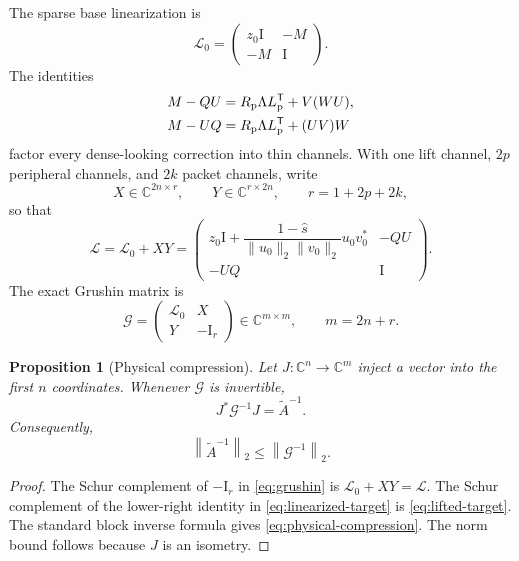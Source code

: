\documentclass[11pt]{article}
\newtheorem{proposition}[theorem]{Proposition}
\theoremstyle{definition}
\theoremstyle{remark}
\newcommand{\C}{\mathbb C}
\newcommand{\Id}{\mathrm I}
\newcommand{\norm}[1]{\left\lVert#1\right\rVert}
\newcommand{\Atilde}{\widetilde A}
\newcommand{\Gmat}{\mathcal G}
\begin{document}
The sparse base linearization is
\begin{equation}
 \mathcal L_0=
 \begin{pmatrix}
  z_0\Id&-M\\
  -M&\Id
 \end{pmatrix}.
 \label{eq:sparse-base}
\end{equation}
The identities
\begin{align}
 M-QU&=R_{\rm p}\Lambda L_{\rm p}^{\mathsf T}+V(WU),
 \label{eq:top-correction}\\
 M-UQ&=R_{\rm p}\Lambda L_{\rm p}^{\mathsf T}+(UV)W
 \label{eq:bottom-correction}
\end{align}
factor every dense-looking correction into thin channels.  With one lift
channel, $2p$ peripheral channels, and $2k$ packet channels, write
\begin{equation}
 X\in\C^{2n\times r},\qquad
 Y\in\C^{r\times2n},\qquad
 r=1+2p+2k,
 \label{eq:channel-shapes}
\end{equation}
so that
\begin{equation}
 \mathcal L=\mathcal L_0+XY
 =
 \begin{pmatrix}
 z_0\Id+\dfrac{1-\widehat s}{\|u_0\|_2\|v_0\|_2}u_0v_0^*
 &-QU\\
 -UQ&\Id
 \end{pmatrix}.
 \label{eq:linearized-target}
\end{equation}
The exact Grushin matrix is
\begin{equation}
 \Gmat=
 \begin{pmatrix}
  \mathcal L_0&X\\
  Y&-\Id_r
 \end{pmatrix}
 \in\C^{m\times m},
 \qquad m=2n+r.
 \label{eq:grushin}
\end{equation}

\begin{proposition}[Physical compression]
\label{prop:physical-compression}
Let $J:\C^n\to\C^m$ inject a vector into the first $n$ coordinates.
Whenever $\Gmat$ is invertible,
\begin{equation}
 J^*\Gmat^{-1}J=\Atilde^{-1}.
 \label{eq:physical-compression}
\end{equation}
Consequently,
\begin{equation}
 \norm{\Atilde^{-1}}_2\leq\norm{\Gmat^{-1}}_2.
 \label{eq:compression-bound}
\end{equation}
\end{proposition}

\begin{proof}
The Schur complement of $-\Id_r$ in \cref{eq:grushin} is
$\mathcal L_0+XY=\mathcal L$.  The Schur complement of the lower-right
identity in \cref{eq:linearized-target} is \cref{eq:lifted-target}.
The standard block inverse formula gives \cref{eq:physical-compression}.
The norm bound follows because $J$ is an isometry.
\end{proof}
\end{document}
